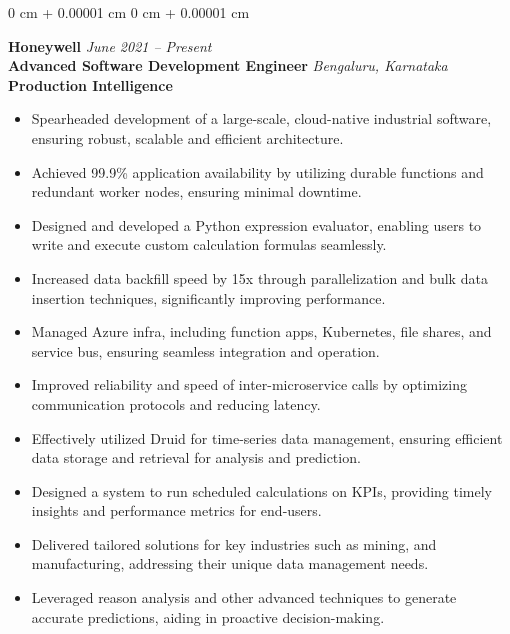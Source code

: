 \documentclass[10pt, letterpaper]{article}
\newenvironment{highlights}{
    \begin{itemize}[
        topsep=0.03 cm,
        parsep=0.02 cm,
        partopsep=0pt,
        itemsep=0pt,
        leftmargin=0 cm + 5pt
    ]
}{
    \end{itemize}
} %
\newenvironment{onecolentry}{
    \begin{adjustwidth}{
        0 cm + 0.00001 cm
    }{
        0 cm + 0.00001 cm
    }
}{
    \end{adjustwidth}
} %
\begin{document}
    
        \begin{onecolentry}
            \textbf{\large Honeywell} \hfill \textit{June 2021 – Present} \\  
            \textbf{\normalsize Advanced Software Development Engineer} \hfill \textit{Bengaluru, Karnataka} \\[0.2cm] %
            \textbf{Production Intelligence} \\  
            \begin{adjustwidth}{0.4cm}{0cm}
                \begin{highlights}
                    \item Spearheaded development of a large-scale, cloud-native industrial software, ensuring robust, scalable and efficient architecture.
                    \item Achieved 99.9\% application availability by utilizing durable functions and redundant worker nodes, ensuring minimal downtime.
                    \item Designed and developed a Python expression evaluator, enabling users to write and execute custom calculation formulas seamlessly.
                    \item Increased data backfill speed by 15x through parallelization and bulk data insertion techniques, significantly improving performance.
                    \item Managed Azure infra, including function apps, Kubernetes, file shares, and service bus, ensuring seamless integration and operation.
                    \item Improved reliability and speed of inter-microservice calls by optimizing communication protocols and reducing latency.
                    \item Effectively utilized Druid for time-series data management, ensuring efficient data storage and retrieval for analysis and prediction.
                    \item Designed a system to run scheduled calculations on KPIs, providing timely insights and performance metrics for end-users.
                    \item Delivered tailored solutions for key industries such as mining, and manufacturing, addressing their unique data management needs.
                    \item Leveraged reason analysis and other advanced techniques to generate accurate predictions, aiding in proactive decision-making.
                    

\end{highlights}
\end{adjustwidth}
\end{onecolentry}
\end{document}
